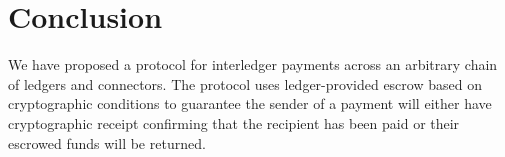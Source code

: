 \documentclass[letterpaper,twocolumn,10pt]{article}
\begin{document}












\section{Conclusion}


We have proposed a protocol for interledger payments across an arbitrary chain of ledgers and connectors. The protocol uses ledger-provided escrow based on cryptographic conditions to guarantee the sender of a payment will either have cryptographic receipt confirming that the recipient has been paid or their escrowed funds will be returned.
\end{document}
